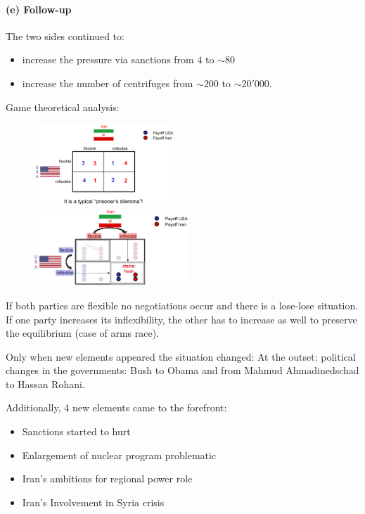 \paragraph{(e) Follow-up}

The two sides continued to:
\begin{itemize}
    \item increase the pressure via sanctions from $4$ to $\sim 80$
    \item increase the number of centrifuges from $\sim 200$ to
        $\sim 20'000$.
\end{itemize}
Game theoretical analysis:

\begin{figure}[h]
    \centering
    \includegraphics[width=0.47\textwidth]{Pictures/iran_us_game_theory_1.png}
    \includegraphics[width=0.52\textwidth]{Pictures/iran_us_game_theory_2.png}
\end{figure}

If both parties are flexible no negotiations occur and there is a lose-lose
situation. If one party increases its inflexibility, the other has to
increase as well to preserve the equilibrium (case of arms race).

Only when new elements appeared the situation changed: At the outset:
political changes in the governments: Bush to Obama and from
Mahmud Ahmadinedschad to Hassan Rohani.

Additionally, 4 new elements came to the forefront:

\begin{itemize}
    \item Sanctions started to hurt
    \item Enlargement of nuclear program problematic
    \item Iran's ambitions for regional power role
    \item Iran's Involvement in Syria crisis
\end{itemize}

